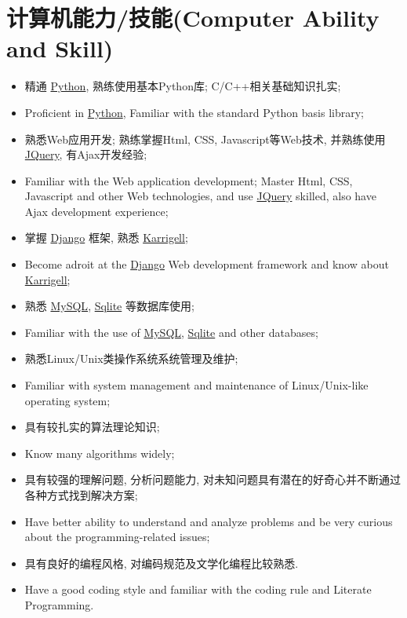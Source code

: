 \documentclass[letterpaper,10pt,english]{manual}
\begin{document}
\section{计算机能力/技能(Computer Ability and Skill)}
\begin{itemize}
\item {} 
精通 \href{http://www.python.org/}{Python}, 熟练使用基本Python库; C/C++相关基础知识扎实;

\item {} 
Proficient in \href{http://www.python.org/}{Python}, Familiar with the standard Python basis library;

\item {} 
熟悉Web应用开发; 熟练掌握Html, CSS, Javascript等Web技术, 并熟练使用 \href{http://jquery.com}{JQuery}, 有Ajax开发经验;

\item {} 
Familiar with the Web application development; Master Html, CSS, Javascript and other Web technologies, and  use \href{http://jquery.com}{JQuery} skilled, also have Ajax development experience;

\item {} 
掌握 \href{http://www.djangoproject.com/}{Django} 框架, 熟悉 \href{http://karrigell.sourceforge.net/}{Karrigell};

\item {} 
Become adroit at the \href{http://www.djangoproject.com/}{Django} Web development framework and know about \href{http://karrigell.sourceforge.net/}{Karrigell};

\item {} 
熟悉 \href{http://www.mysql.com}{MySQL}, \href{http://www.sqlite.org}{Sqlite} 等数据库使用;

\item {} 
Familiar with the use of \href{http://www.mysql.com}{MySQL}, \href{http://www.sqlite.org}{Sqlite} and other databases;

\item {} 
熟悉Linux/Unix类操作系统系统管理及维护;

\item {} 
Familiar with system management and maintenance of Linux/Unix-like operating system;

\item {} 
具有较扎实的算法理论知识;

\item {} 
Know many algorithms widely;

\item {} 
具有较强的理解问题, 分析问题能力, 对未知问题具有潜在的好奇心并不断通过各种方式找到解决方案;

\item {} 
Have better ability to understand and analyze problems and be very curious about the programming-related issues;

\item {} 
具有良好的编程风格, 对编码规范及文学化编程比较熟悉.

\item {} 
Have a good coding style and familiar with the coding rule and Literate Programming.

\end{itemize}
\end{document}
